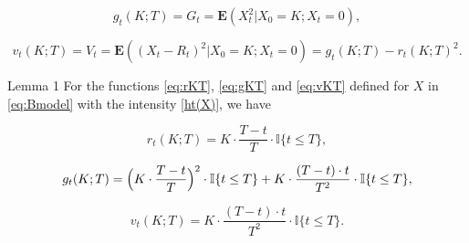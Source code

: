 \begin{equation}\label{eq:gKT}

	{g_t}(K; T) = G_t = \textbf{E}(X_t^2 | X_0 = K; X_t = 0),

\end{equation}

\begin{equation}\label{eq:vKT}

	{v_t}(K; T) = V_t = \textbf{E}((X_t - R_t)^2 | X_0 = K; X_t = 0) = {g_t}(K; T) - {r_t}(K; T)^2.

\end{equation}








\hypertarget{b:l1}{}



\begin{newthm}{Lemma 1} For the functions {\rm \eqref{eq:rKT}, \eqref{eq:gKT}} and \eqref{eq:vKT} defined for $X$ in \eqref{eq:Bmodel} with the intensity {\rm \eqref{ht(X)},} we have 

\begin{equation}\label{eq:rKTq}

	{r_t}(K; T) = K \cdot{\frac{T - t}{T}}\cdot \mathbb{I}\{t \leq T\},

\end{equation}

\begin{equation}\label{eq:gKTq}

	{g_t}(K; T) = { \Bigl(K \cdot{\frac{T - t}{T}}\Bigr)^2}\cdot \mathbb{I}\{t \leq T\} + K \cdot{\frac{(T - t)\cdot  t}{T^2}}\cdot \mathbb{I}\{t \leq T\},

\end{equation}

\begin{equation}\label{eq:vKTq}

	{v_t}(K; T) = K \cdot{\frac{(T - t)\cdot  t}{T^2}}\cdot \mathbb{I}\{t \leq T\}.

\end{equation}

\end{newthm}





\smallskip



